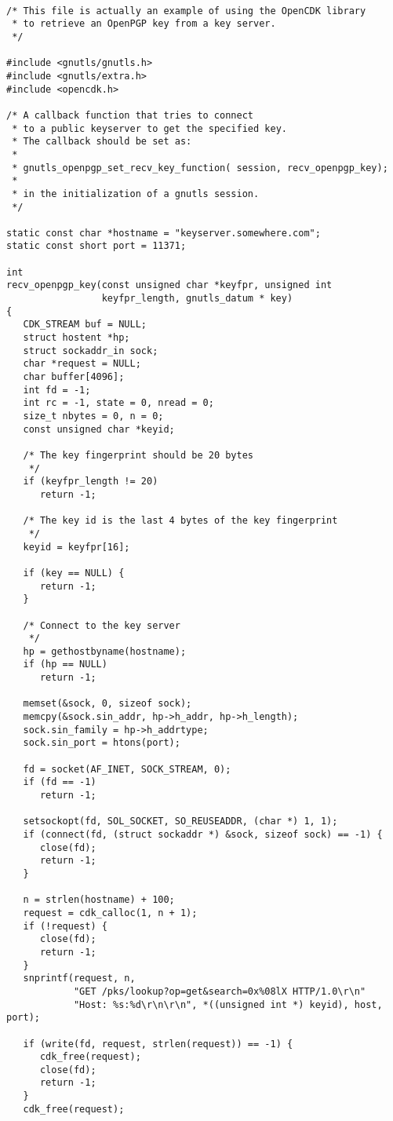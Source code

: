 \begin {verbatim}

/* This file is actually an example of using the OpenCDK library
 * to retrieve an OpenPGP key from a key server.
 */

#include <gnutls/gnutls.h>
#include <gnutls/extra.h>
#include <opencdk.h>

/* A callback function that tries to connect
 * to a public keyserver to get the specified key.
 * The callback should be set as:
 *
 * gnutls_openpgp_set_recv_key_function( session, recv_openpgp_key);
 *
 * in the initialization of a gnutls session.
 */

static const char *hostname = "keyserver.somewhere.com";
static const short port = 11371;

int
recv_openpgp_key(const unsigned char *keyfpr, unsigned int
                 keyfpr_length, gnutls_datum * key)
{
   CDK_STREAM buf = NULL;
   struct hostent *hp;
   struct sockaddr_in sock;
   char *request = NULL;
   char buffer[4096];
   int fd = -1;
   int rc = -1, state = 0, nread = 0;
   size_t nbytes = 0, n = 0;
   const unsigned char *keyid;

   /* The key fingerprint should be 20 bytes
    */
   if (keyfpr_length != 20)
      return -1;

   /* The key id is the last 4 bytes of the key fingerprint
    */
   keyid = keyfpr[16];

   if (key == NULL) {
      return -1;
   }

   /* Connect to the key server 
    */
   hp = gethostbyname(hostname);
   if (hp == NULL)
      return -1;

   memset(&sock, 0, sizeof sock);
   memcpy(&sock.sin_addr, hp->h_addr, hp->h_length);
   sock.sin_family = hp->h_addrtype;
   sock.sin_port = htons(port);

   fd = socket(AF_INET, SOCK_STREAM, 0);
   if (fd == -1)
      return -1;

   setsockopt(fd, SOL_SOCKET, SO_REUSEADDR, (char *) 1, 1);
   if (connect(fd, (struct sockaddr *) &sock, sizeof sock) == -1) {
      close(fd);
      return -1;
   }

   n = strlen(hostname) + 100;
   request = cdk_calloc(1, n + 1);
   if (!request) {
      close(fd);
      return -1;
   }
   snprintf(request, n,
            "GET /pks/lookup?op=get&search=0x%
            "Host: %

   if (write(fd, request, strlen(request)) == -1) {
      cdk_free(request);
      close(fd);
      return -1;
   }
   cdk_free(request);


\end{verbatim}
